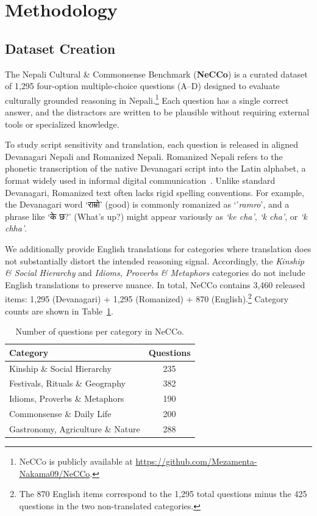 \documentclass[10pt, a4paper]{article}
\begin{document}
\section{Methodology}

\subsection{Dataset Creation}

The Nepali Cultural \& Commonsense Benchmark (\textbf{NeCCo}) is a curated dataset of 1,295 four-option multiple-choice questions (A--D) designed to evaluate culturally grounded reasoning in Nepali.\footnote{NeCCo is publicly available at \url{https://github.com/Mezamenta-Nakama09/NeCCo}.} Each question has a single correct answer, and the distractors are written to be plausible without requiring external tools or specialized knowledge.

To study script sensitivity and translation, each question is released in aligned Devanagari Nepali and Romanized Nepali. Romanized Nepali refers to the phonetic transcription of the native Devanagari script into the Latin alphabet, a format widely used in informal digital communication~\cite{madhani2023aksharantar}. Unlike standard Devanagari, Romanized text often lacks rigid spelling conventions. For example, the Devanagari word {\hindifont `राम्रो'} (good) is commonly romanized as `'\textit{ramro}', and a phrase like {\hindifont `के छ?'} (What's up?) might appear variously as \textit{`ke cha'}, \textit{`k cha'}, or \textit{`k chha'}.

We additionally provide English translations for categories where translation does not substantially distort the intended reasoning signal. Accordingly, the \textit{Kinship \& Social Hierarchy} and \textit{Idioms, Proverbs \& Metaphors} categories do not include English translations to preserve nuance. In total, NeCCo contains 3,460 released items: 1,295 (Devanagari) + 1,295 (Romanized) + 870 (English).\footnote{The 870 English items correspond to the 1,295 total questions minus the 425 questions in the two non-translated categories.} Category counts are shown in Table~\ref{tab:data_category_count}.

\begin{table}[h]
    \centering
    \small
    \begin{tabular}{lc}
    \hline
    \textbf{Category} & \textbf{Questions} \\
    \hline
    Kinship \& Social Hierarchy            & 235 \\
    Festivals, Rituals \& Geography        & 382 \\
    Idioms, Proverbs \& Metaphors          & 190 \\
    Commonsense \& Daily Life              & 200 \\
    Gastronomy, Agriculture \& Nature      & 288 \\
    \hline
    \end{tabular}
    \caption{\small Number of questions per category in NeCCo.}
    \label{tab:data_category_count}
\end{table}
\end{document}
